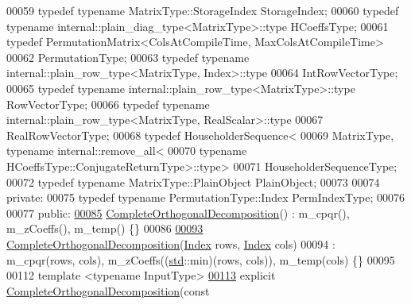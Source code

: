 \begin{DoxyCode}
00059   \textcolor{keyword}{typedef} \textcolor{keyword}{typename} MatrixType::StorageIndex StorageIndex;
00060   \textcolor{keyword}{typedef} \textcolor{keyword}{typename} internal::plain\_diag\_type<MatrixType>::type HCoeffsType;
00061   \textcolor{keyword}{typedef} PermutationMatrix<ColsAtCompileTime, MaxColsAtCompileTime>
00062       PermutationType;
00063   \textcolor{keyword}{typedef} \textcolor{keyword}{typename} internal::plain\_row\_type<MatrixType, Index>::type
00064       IntRowVectorType;
00065   \textcolor{keyword}{typedef} \textcolor{keyword}{typename} internal::plain\_row\_type<MatrixType>::type RowVectorType;
00066   \textcolor{keyword}{typedef} \textcolor{keyword}{typename} internal::plain\_row\_type<MatrixType, RealScalar>::type
00067       RealRowVectorType;
00068   \textcolor{keyword}{typedef} HouseholderSequence<
00069       MatrixType, \textcolor{keyword}{typename} internal::remove\_all<
00070                       \textcolor{keyword}{typename} HCoeffsType::ConjugateReturnType>::type>
00071       HouseholderSequenceType;
00072   \textcolor{keyword}{typedef} \textcolor{keyword}{typename} MatrixType::PlainObject PlainObject;
00073 
00074  \textcolor{keyword}{private}:
00075   \textcolor{keyword}{typedef} \textcolor{keyword}{typename} PermutationType::Index PermIndexType;
00076 
00077  \textcolor{keyword}{public}:
\hyperlink{group___q_r___module_a7ba33814fd3fdc62f6179cdcd655c679}{00085}   \hyperlink{group___q_r___module_a7ba33814fd3fdc62f6179cdcd655c679}{CompleteOrthogonalDecomposition}() : m\_cpqr(), m\_zCoeffs(), m\_temp() \{\}
00086 
\hyperlink{group___q_r___module_aa6c282dd7452ebe754024edb71bebd09}{00093}   \hyperlink{group___q_r___module_aa6c282dd7452ebe754024edb71bebd09}{CompleteOrthogonalDecomposition}(\hyperlink{namespace_eigen_a62e77e0933482dafde8fe197d9a2cfde}{Index} rows, 
      \hyperlink{namespace_eigen_a62e77e0933482dafde8fe197d9a2cfde}{Index} cols)
00094       : m\_cpqr(rows, cols), m\_zCoeffs((\hyperlink{namespacestd}{std}::min)(rows, cols)), m\_temp(cols) \{\}
00095 
00112   \textcolor{keyword}{template} <\textcolor{keyword}{typename} InputType>
\hyperlink{group___q_r___module_afcfaf7a395f853247c23bb52b1ffb1cc}{00113}   \textcolor{keyword}{explicit} \hyperlink{group___q_r___module_afcfaf7a395f853247c23bb52b1ffb1cc}{CompleteOrthogonalDecomposition}(\textcolor{keyword}{const} 

\end{DoxyCode}

